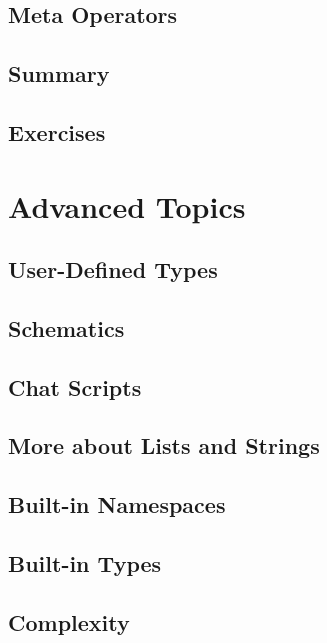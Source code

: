 \documentclass[oneside]{book}
\begin{document}
\section{Meta Operators}
\blindtext

\section{Summary}
\blindtext

\section{Exercises}
\blindtext

\chapter{Advanced Topics}
\blindtext

\section{User-Defined Types}
\blindtext

\section{Schematics}
\blindtext

\section{Chat Scripts}
\blindtext

\section{More about Lists and Strings}
\blindtext

\section{Built-in Namespaces}
\blindtext

\section{Built-in Types}
\blindtext

\section{Complexity}
\blindtext
\end{document}
